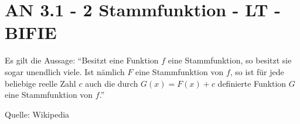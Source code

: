 \section{AN 3.1 - 2 Stammfunktion - LT - BIFIE}

\begin{beispiel}[AN 3.1]{1} %
Es gilt die Aussage:
"`Besitzt eine Funktion $f$ eine Stammfunktion, so besitzt sie sogar unendlich viele. Ist nämlich $F$ eine Stammfunktion von $f$, so ist für jede beliebige reelle Zahl $c$ auch die durch $G(x) = F(x) + c$ definierte Funktion $G$ eine Stammfunktion von $f$."'
\begin{flushright}
\tiny{Quelle: Wikipedia}
\end{flushright}


 \end{beispiel}